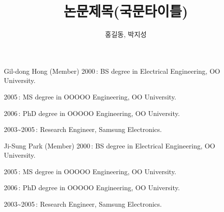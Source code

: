 \documentclass{kieee}
\title{논문제목(국문타이틀)}
\author{홍길동\affmark, 박지성\affmark\corrmark}
\affiliation{%
$^{*}$\,Professor, Dept.\ of Electronics Engineering, OO University}
\begin{document}
\maketitle














\begin{authorbiographies}

\begin{biography}{Gil-dong Hong (Member)}
2000\,: BS degree in Electrical Engineering, OO University.\par
2005\,: MS degree in OOOOO Engineering, OO University.\par
2006\,: PhD degree in OOOOO Engineering, OO University.\par
2003\textasciitilde2005\,: Research Engineer, Samsung Electronics.
\end{biography}

\begin{biography}{Ji-Sung Park (Member)}
2000\,: BS degree in Electrical Engineering, OO University.\par
2005\,: MS degree in OOOOO Engineering, OO University.\par
2006\,: PhD degree in OOOOO Engineering, OO University.\par
2003\textasciitilde2005\,: Research Engineer, Samsung Electronics.
\end{biography}

\end{authorbiographies}
\end{document}
